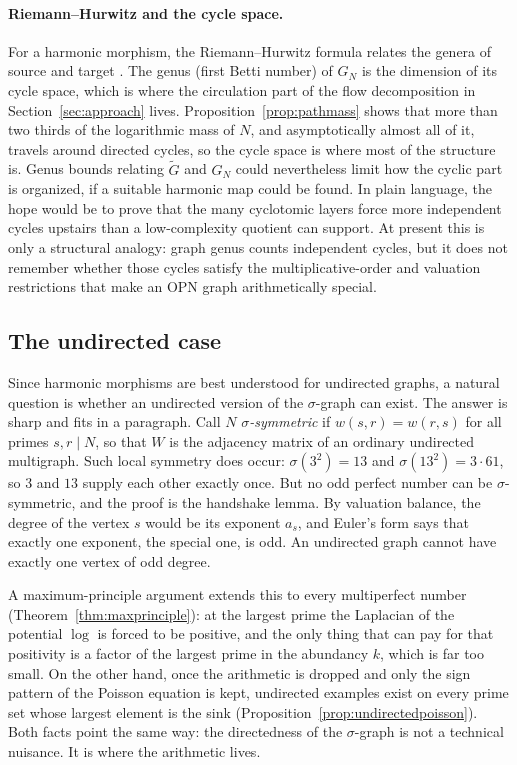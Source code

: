 \documentclass[11pt]{article}
\theoremstyle{definition}
\theoremstyle{remark}
\begin{document}
\paragraph{Riemann--Hurwitz and the cycle space.} For a harmonic
morphism, the Riemann--Hurwitz formula relates the genera of source and
target \cite{BN, MJ2026}. The genus (first Betti number) of $G_N$ is
the dimension of its cycle space, which is where the circulation part of the
flow decomposition in Section~\ref{sec:approach} lives.  Proposition~\ref{prop:pathmass} shows
that more than two thirds of the logarithmic mass of $N$, and asymptotically
almost all of it, travels around directed cycles, so the cycle space is
where most of the structure is.  Genus bounds relating $\widetilde G$ and $G_N$ could nevertheless limit how
the cyclic part is organized, if a suitable harmonic map could be found.
In plain language, the hope would be to prove that the many cyclotomic layers
force more independent cycles upstairs than a low-complexity quotient can
support.  At present this is only a structural analogy: graph genus counts
independent cycles, but it does not remember whether those cycles satisfy the
multiplicative-order and valuation restrictions that make an OPN graph
arithmetically special.

\subsection{The undirected case}

Since harmonic morphisms are best understood for undirected graphs, a
natural question is whether an undirected version of the $\sigma$-graph can
exist.  The answer is sharp and fits in a paragraph.  Call $N$
\emph{$\sigma$-symmetric} if $w(s,r)=w(r,s)$ for all primes $s,r\mid N$, so
that $W$ is the adjacency matrix of an ordinary undirected multigraph.  Such
local symmetry does occur: $\sigma(3^2)=13$ and $\sigma(13^2)=3\cdot61$, so
$3$ and $13$ supply each other exactly once.  But no odd perfect number can be
$\sigma$-symmetric, and the proof is the handshake lemma.  By valuation
balance, the degree of the vertex $s$ would be its exponent $a_s$, and Euler's
form says that exactly one exponent, the special one, is odd.  An undirected
graph cannot have exactly one vertex of odd degree.

A maximum-principle argument extends this to every multiperfect number
(Theorem~\ref{thm:maxprinciple}): at the largest prime the Laplacian of the
potential $\log$ is forced to be positive, and the only thing that can pay for
that positivity is a factor of the largest prime in the abundancy $k$, which
is far too small.  On the other hand, once the arithmetic is dropped and only
the sign pattern of the Poisson equation is kept, undirected examples exist on every
prime set whose largest element is the sink
(Proposition~\ref{prop:undirectedpoisson}).  Both facts point the same way:
the directedness of the $\sigma$-graph is not a technical nuisance.  It is
where the arithmetic lives.
\end{document}
